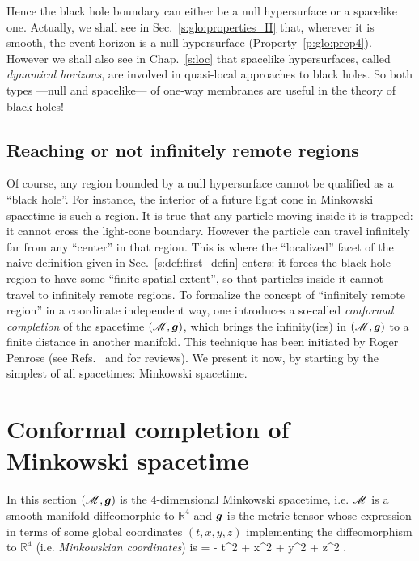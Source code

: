 Hence the black hole boundary can either be a null hypersurface or a spacelike one.
Actually, we shall see in Sec.~\ref{s:glo:properties_H} that, wherever it is smooth,
the event horizon is a null hypersurface  (Property~\ref{p:glo:prop4}).
However we shall also see in Chap.~\ref{s:loc} that spacelike hypersurfaces,
called \emph{dynamical
horizons}, are involved
in quasi-local approaches to black holes. So both types ---null and spacelike--- of one-way membranes
are useful in the theory of black holes!

\subsection{Reaching or not infinitely remote regions}

Of course, any region bounded by a null hypersurface cannot be qualified as
a ``black hole''. For instance, the interior of a future light cone in Minkowski
spacetime is such a region. It is true that any particle moving inside it is
trapped: it cannot cross the light-cone boundary. However the particle can travel
infinitely far from any ``center'' in that region. This is where the ``localized''
facet of the naive definition given in Sec.~\ref{s:def:first_defin} enters:
it forces the black hole region to have some ``finite spatial extent'',
so that particles inside it cannot travel to infinitely remote regions.
To formalize the concept of ``infinitely remote region'' in a coordinate independent way, one
introduces a so-called \emph{conformal completion} of the spacetime $(\mathscr{M},\bm{g})$, which brings
the infinity(ies) in $(\mathscr{M},\bm{g})$ to a finite distance in another manifold.
This technique has been initiated by Roger Penrose \cite{Penro63,Penro64} (see
Refs.~\cite{Fraue04} and \cite{Nicol17} for reviews). We present it now, by
starting by the simplest
of all spacetimes: Minkowski spacetime.



\section{Conformal completion of Minkowski spacetime} \label{s:glo:conf_Mink}

In this section $(\mathscr{M},\bm{g})$ is the 4-dimensional Minkowski spacetime,
i.e. $\mathscr{M}$ is a smooth manifold diffeomorphic to $\mathbb{R}^4$ and $\bm{g}$
is the metric tensor whose expression in terms of some global coordinates
$(t, x, y, z)$ implementing the diffeomorphism to $\mathbb{R}^4$
(i.e. \emph{Minkowskian coordinates})
is
\be \label{e:glo:Mink_metric}
     = - \dd t^2 + \dd x^2 + \dd y^2 + \dd z^2 .
\ee

